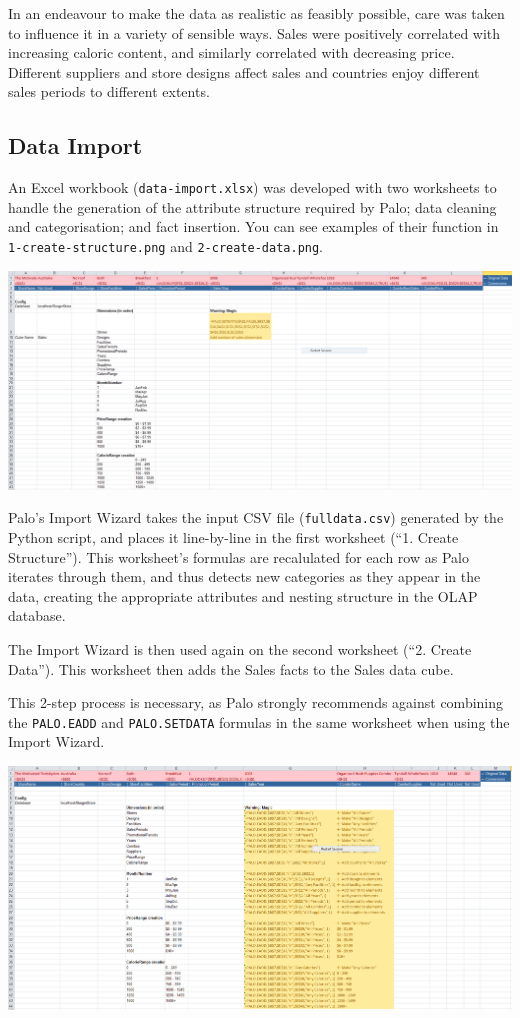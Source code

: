 \documentclass[11pt, a4paper]{article}
\begin{document}
In an endeavour to make the data as realistic as feasibly possible, care was taken to influence it in a variety of sensible ways. Sales were positively correlated with increasing caloric content, and similarly correlated with decreasing price.
Different suppliers and store designs affect sales and countries enjoy different sales periods to different extents.

\subsection*{Data Import}

An Excel workbook (\texttt{data-import.xlsx}) was developed with two worksheets to handle the generation of the attribute structure required by Palo; data cleaning and categorisation; and fact insertion. You can see examples of their function in \texttt{1-create-structure.png} and \texttt{2-create-data.png}.

\includegraphics[width=15cm]{diagrams/create-data}

Palo's Import Wizard takes the input CSV file (\texttt{fulldata.csv}) generated by the Python script, and places it line-by-line in the first worksheet (``1. Create Structure'').
This worksheet's formulas are recalulated for each row as Palo iterates through them, and thus detects new categories as they appear in the data, creating the appropriate attributes and nesting structure in the OLAP database.

The Import Wizard is then used again on the second worksheet (``2. Create Data''). This worksheet then adds the Sales facts to the Sales data cube.

This 2-step process is necessary, as Palo strongly recommends against combining the \texttt{PALO.EADD} and \texttt{PALO.SETDATA} formulas in the same worksheet when using the Import Wizard.

\includegraphics[width=15cm]{diagrams/create-structure}
\end{document}
